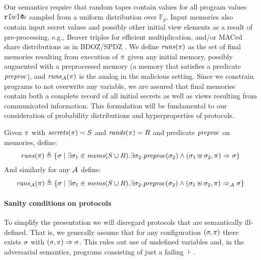 Our semantics require that random tapes contain values for all program
values $\texttt{r[}w\texttt{]}\texttt{@}\iota$ sampled from a uniform distribution
over $\mathbb{F}_p$. Input memories also contain input secret values
and possibly other initial view elements as a result of
pre-processing, e.g., Beaver triples for efficient multiplication,
and/or MACed share distributions as in BDOZ/SPDZ
\cite{evans2018pragmatic,10.1007/978-3-030-68869-1_3}. We define
$\mathit{runs}(\pi)$ as the set of final memories resulting from execution
of $\pi$ given any initial memory, possibly augmented with a
preprocessed memory (a memory that satisfies a predicate $\mathit{preproc}$),
and $\mathit{runs}_{\mathcal{A}}(\pi)$ is the analog in the malicious setting. Since we
constrain programs to not overwrite any variable, we are assured that
final memories contain both a complete record of all initial secrets
as well as views resulting from communicated information. This
formulation will be fundamental to our consideration of probability
distributions and hyperproperties of protocols.
\begin{definition}
  \label{def-runs}
  Given $\pi$ with $\mathit{secrets}(\pi) = S$ and $\mathit{rands}(\pi) = R$ and
  predicate $\mathit{preproc}$ on memories, define:
  $$
  \begin{array}{c}
    \mathit{runs}(\pi) \triangleq 
    \{ \sigma \mid \exists \sigma_1 \in \mathit{mems}(S \cup R) . 
    \exists \sigma_2 . \mathit{preproc}(\sigma_2) \wedge
    (\sigma_1 \uplus \sigma_2,\pi) \Rightarrow \sigma \}
  \end{array}
  $$
  And similarly for any $\mathcal{A}$ define:
  $$
  \begin{array}{c}
    \mathit{runs}_{\mathcal{A}}(\pi) \triangleq 
    \{ \sigma \mid \exists \sigma_1 \in \mathit{mems}(S \cup R) . 
    \exists \sigma_2 . \mathit{preproc}(\sigma_2) \wedge
    (\sigma_1 \uplus \sigma_2,\pi) \Rightarrow_{\mathcal{A}} \sigma \}
  \end{array}
  $$
\end{definition}

\paragraph{Sanity conditions on protocols} To simplify
the presentation we will disregard protocols that are semantically
ill-defined. That is, we generally assume that for any
configuration $(\sigma, \pi)$ there exists $\sigma$
with $(\sigma, \pi) \Rightarrow \sigma$. This rules out
use of undefined variables and, in the adversarial semantics,
programs consisting of just a failing $\assert$.

